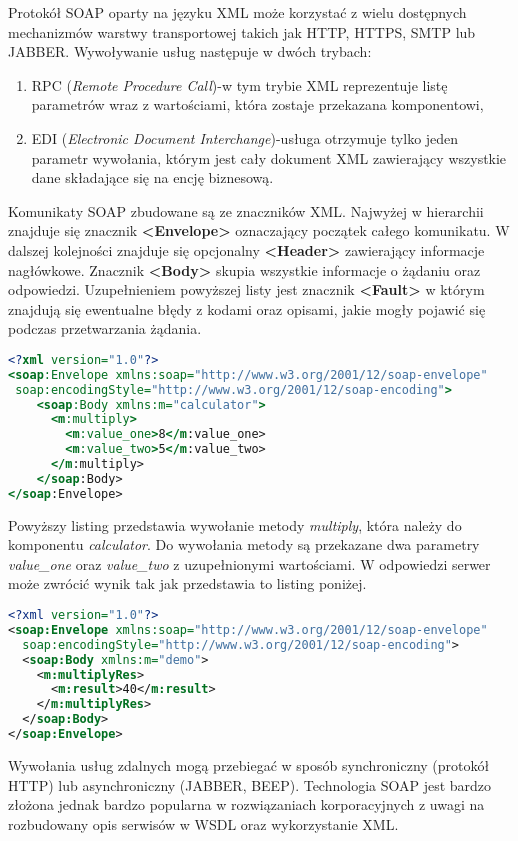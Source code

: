 Protokół SOAP oparty na języku XML może korzystać z wielu dostępnych mechanizmów warstwy transportowej takich jak HTTP, HTTPS, SMTP lub JABBER\@. Wywoływanie usług następuje w dwóch trybach:
\begin{enumerate}
  \item RPC (\textit{Remote Procedure Call})-w tym trybie XML reprezentuje listę parametrów wraz z wartościami, która zostaje przekazana komponentowi,
  \item EDI (\textit{Electronic Document Interchange})-usługa otrzymuje tylko jeden parametr wywołania, którym jest cały dokument XML zawierający wszystkie dane składające się na encję biznesową.
\end{enumerate}
\par Komunikaty SOAP zbudowane są ze znaczników XML\@. Najwyżej w hierarchii znajduje się znacznik \textbf{<Envelope>} oznaczający początek całego komunikatu. W dalszej kolejności znajduje się opcjonalny \textbf{<Header>} zawierający informacje nagłówkowe. Znacznik \textbf{<Body>} skupia wszystkie informacje o żądaniu oraz odpowiedzi. Uzupełnieniem powyższej listy jest znacznik \textbf{<Fault>} w którym znajdują się ewentualne błędy z kodami oraz opisami, jakie mogły pojawić się podczas przetwarzania żądania.
\begin{lstlisting}[language=xslt, caption=Przykład żądania SOAP]
<?xml version="1.0"?>
<soap:Envelope xmlns:soap="http://www.w3.org/2001/12/soap-envelope"
 soap:encodingStyle="http://www.w3.org/2001/12/soap-encoding">
    <soap:Body xmlns:m="calculator">
      <m:multiply>
        <m:value_one>8</m:value_one>
        <m:value_two>5</m:value_two>
      </m:multiply>  
    </soap:Body>
</soap:Envelope> 
\end{lstlisting}
Powyższy listing przedstawia wywołanie metody \textit{multiply}, która należy do komponentu \textit{calculator}. Do wywołania metody są przekazane dwa parametry \textit{value\_one} oraz \textit{value\_two} z uzupełnionymi wartościami. W odpowiedzi serwer może zwrócić wynik tak jak przedstawia to listing poniżej.
\begin{lstlisting}[language=xml, caption=Odpowiedź SOAP serwera na żadanie klienta] 
<?xml version="1.0"?>
<soap:Envelope xmlns:soap="http://www.w3.org/2001/12/soap-envelope"
  soap:encodingStyle="http://www.w3.org/2001/12/soap-encoding">
  <soap:Body xmlns:m="demo">
    <m:multiplyRes>
      <m:result>40</m:result>
    </m:multiplyRes>
  </soap:Body>
</soap:Envelope> 
\end{lstlisting}
Wywołania usług zdalnych mogą przebiegać w sposób synchroniczny (protokół HTTP) lub asynchroniczny (JABBER, BEEP).
Technologia SOAP jest bardzo złożona jednak bardzo popularna w rozwiązaniach korporacyjnych z uwagi na rozbudowany opis serwisów w WSDL oraz wykorzystanie XML\@.
